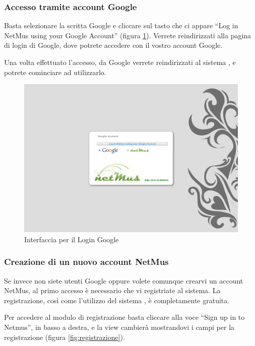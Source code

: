 \subsubsection*{Accesso tramite account Google}
Basta selezionare la scritta Google e cliccare sul tasto che ci appare ``Log in
NetMus using your Google Account'' (figura \ref{fig:loginGoogle}). Verrete
reindirizzati alla pagina di login di Google, dove potrete accedere con il
vostro account Google.

Una volta effettuato l'accesso, da Google verrete reindirizzati al sistema
, e potrete cominciare ad utilizzarlo.
\begin{figure}[!htbp]
  \centering
  \includegraphics[width=14cm]{img/MU/loginGoogle.png}
\caption{Interfaccia per il Login Google}
\label{fig:loginGoogle}
\end{figure}

\subsubsection*{Creazione di un nuovo account NetMus}
Se invece non siete utenti Google oppure volete comunque crearvi un account
NetMus, al primo accesso \`e necessario che vi registriate al
sistema. La registrazione, cos\`i come l'utilizzo del sistema ,
\`e completamente gratuita.

Per accedere al modulo di registrazione basta cliccare alla voce ``Sign up in to
Netmus'', in basso a destra, e la view cambier\`a mostrandovi i campi per la
registrazione (figura \ref{fig:registrazione}).

